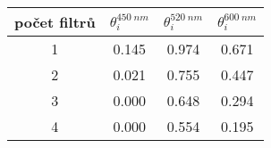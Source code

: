 \begin{tabular}[t]{
  S[table-format=1.0]
  S[table-format=1.2]
  S[table-format=1.2]
  S[table-format=1.2]
}\toprule
{počet filtrů} & {$\theta_i^{\SI{450}{nm}}$} & {$\theta_i^{\SI{520}{nm}}$} & {$\theta_i^{\SI{600}{nm}}$}\\              & 0.145                     & 0.974                       & 0.671                     \\
2              & 0.021                     & 0.755                       & 0.447                     \\
3              & 0.000                     & 0.648                       & 0.294                     \\
4              & 0.000                     & 0.554                       & 0.195                     \\\bottomrule
\end{tabular}